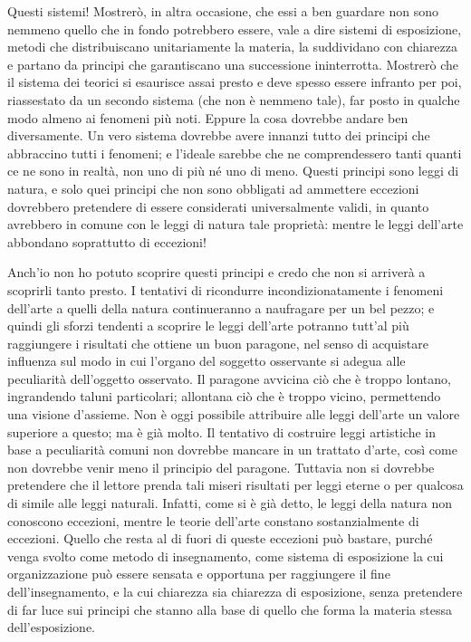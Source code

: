 \documentclass{../../lib/gs}
\begin{document}
Questi sistemi! Mostrerò, in altra occasione, che essi a ben guardare non sono nemmeno quello che in fondo potrebbero essere, vale a dire sistemi di esposizione, metodi che distribuiscano unitariamente la materia, la suddividano con chiarezza e partano da principi che garantiscano una successione ininterrotta. Mostrerò che il sistema dei teorici si esaurisce assai presto e deve spesso essere infranto per poi, riassestato da un secondo sistema (che non è nemmeno tale), far posto in qualche modo almeno ai fenomeni più noti. Eppure la cosa dovrebbe andare ben diversamente. Un vero sistema dovrebbe avere innanzi tutto dei principi che abbraccino tutti i fenomeni; e l'ideale sarebbe che ne comprendessero tanti quanti ce ne sono in realtà, non uno di più né uno di meno. Questi principi sono leggi di natura, e solo quei principi che non sono obbligati ad ammettere eccezioni dovrebbero pretendere di essere considerati universalmente validi, in quanto avrebbero in comune con le leggi di natura tale proprietà: mentre le leggi dell'arte abbondano soprattutto di eccezioni!

Anch'io non ho potuto scoprire questi principi e credo che non si arriverà a scoprirli tanto presto. I tentativi di ricondurre incondizionatamente i fenomeni dell'arte a quelli della natura continueranno a naufragare per un bel pezzo; e quindi gli sforzi tendenti a scoprire le leggi dell'arte potranno tutt'al più raggiungere i risultati che ottiene un buon paragone, nel senso di acquistare influenza sul modo in cui l'organo del soggetto osservante si adegua alle peculiarità dell'oggetto osservato. Il paragone avvicina ciò che è troppo lontano, ingrandendo taluni particolari; allontana ciò che è troppo vicino, permettendo una visione d'assieme. Non è oggi possibile attribuire alle leggi dell'arte un valore superiore a questo; ma è già molto. Il tentativo di costruire leggi artistiche in base a peculiarità comuni non dovrebbe mancare in un trattato d'arte, così come non dovrebbe venir meno il principio del paragone. Tuttavia non si dovrebbe pretendere che il lettore prenda tali miseri risultati per leggi eterne o per qualcosa di simile alle leggi naturali. Infatti, come si è già detto, le leggi della natura non conoscono eccezioni, mentre le teorie dell'arte constano sostanzialmente di eccezioni. Quello che resta al di fuori di queste eccezioni può bastare, purché venga svolto come metodo di insegnamento, come sistema di esposizione la cui organizzazione può essere sensata e opportuna per raggiungere il fine dell'insegnamento, e la cui chiarezza sia chiarezza di esposizione, senza pretendere di far luce sui principi che stanno alla base di quello che forma la materia stessa dell'esposizione.
\end{document}
